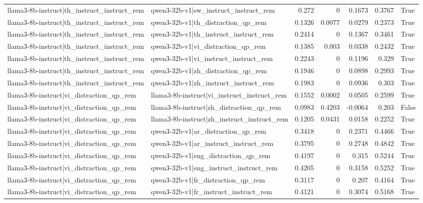 \begin{table}
\begin{tabular}{l l r r r r l}
llama3-8b-instruct|th_instruct_instruct_rem & qwen3-32b-v1|sw_instruct_instruct_rem & 0.272 & 0 & 0.1673 & 0.3767 & True \\
llama3-8b-instruct|th_instruct_instruct_rem & qwen3-32b-v1|th_distraction_qp_rem & 0.1326 & 0.0077 & 0.0279 & 0.2373 & True \\
llama3-8b-instruct|th_instruct_instruct_rem & qwen3-32b-v1|th_instruct_instruct_rem & 0.2414 & 0 & 0.1367 & 0.3461 & True \\
llama3-8b-instruct|th_instruct_instruct_rem & qwen3-32b-v1|vi_distraction_qp_rem & 0.1385 & 0.003 & 0.0338 & 0.2432 & True \\
llama3-8b-instruct|th_instruct_instruct_rem & qwen3-32b-v1|vi_instruct_instruct_rem & 0.2243 & 0 & 0.1196 & 0.329 & True \\
llama3-8b-instruct|th_instruct_instruct_rem & qwen3-32b-v1|zh_distraction_qp_rem & 0.1946 & 0 & 0.0898 & 0.2993 & True \\
llama3-8b-instruct|th_instruct_instruct_rem & qwen3-32b-v1|zh_instruct_instruct_rem & 0.1983 & 0 & 0.0936 & 0.303 & True \\
llama3-8b-instruct|vi_distraction_qp_rem & llama3-8b-instruct|vi_instruct_instruct_rem & 0.1552 & 0.0002 & 0.0505 & 0.2599 & True \\
llama3-8b-instruct|vi_distraction_qp_rem & llama3-8b-instruct|zh_distraction_qp_rem & 0.0983 & 0.4203 & -0.0064 & 0.203 & False \\
llama3-8b-instruct|vi_distraction_qp_rem & llama3-8b-instruct|zh_instruct_instruct_rem & 0.1205 & 0.0431 & 0.0158 & 0.2252 & True \\
llama3-8b-instruct|vi_distraction_qp_rem & qwen3-32b-v1|ar_distraction_qp_rem & 0.3418 & 0 & 0.2371 & 0.4466 & True \\
llama3-8b-instruct|vi_distraction_qp_rem & qwen3-32b-v1|ar_instruct_instruct_rem & 0.3795 & 0 & 0.2748 & 0.4842 & True \\
llama3-8b-instruct|vi_distraction_qp_rem & qwen3-32b-v1|eng_distraction_qp_rem & 0.4197 & 0 & 0.315 & 0.5244 & True \\
llama3-8b-instruct|vi_distraction_qp_rem & qwen3-32b-v1|eng_instruct_instruct_rem & 0.4205 & 0 & 0.3158 & 0.5252 & True \\
llama3-8b-instruct|vi_distraction_qp_rem & qwen3-32b-v1|fr_distraction_qp_rem & 0.3117 & 0 & 0.207 & 0.4164 & True \\
llama3-8b-instruct|vi_distraction_qp_rem & qwen3-32b-v1|fr_instruct_instruct_rem & 0.4121 & 0 & 0.3074 & 0.5168 & True \\

\end{tabular}
\end{table}
